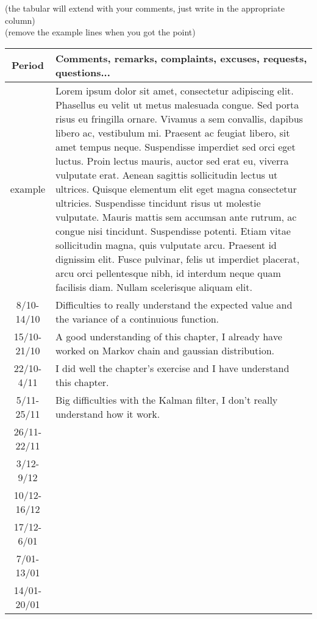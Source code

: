 \documentclass[10pt,a4paper]{article}
\begin{document}
 


\pagestyle{fancy}
 
 
 

(the tabular will extend with your comments, just write in the appropriate column)\\
(remove the example lines when you got the point)\\


\noindent\begin{tabular}{|c|p{}|}
\hline
Period & Comments, remarks, complaints, excuses, requests, questions...\\
\hline
\hline
example & Lorem ipsum dolor sit amet, consectetur adipiscing elit. Phasellus eu velit ut metus malesuada congue. Sed porta risus eu fringilla ornare. Vivamus a sem convallis, dapibus libero ac, vestibulum mi. Praesent ac feugiat libero, sit amet tempus neque. Suspendisse imperdiet sed orci eget luctus. Proin lectus mauris, auctor sed erat eu, viverra vulputate erat. Aenean sagittis sollicitudin lectus ut ultrices. Quisque elementum elit eget magna consectetur ultricies. Suspendisse tincidunt risus ut molestie vulputate. Mauris mattis sem accumsan ante rutrum, ac congue nisi tincidunt. Suspendisse potenti. Etiam vitae sollicitudin magna, quis vulputate arcu. Praesent id dignissim elit. Fusce pulvinar, felis ut imperdiet placerat, arcu orci pellentesque nibh, id interdum neque quam facilisis diam. Nullam scelerisque aliquam elit.\\
\hline
8/10-14/10 &Difficulties to really understand the expected value and the variance of a continuious function.\\ 
\hline
15/10-21/10 &A good understanding of this chapter, I already have worked on Markov chain and gaussian distribution.\\ 
\hline
22/10-4/11 &I did well the chapter's exercise and I have understand this chapter.\\ 
\hline
5/11-25/11 &Big difficulties with the Kalman filter, I don't really understand how it work.\\
\hline
26/11-22/11 &\\
\hline
3/12-9/12 &\\
\hline
10/12-16/12  &\\
\hline
17/12-6/01&\\
\hline
7/01-13/01 &\\
\hline
14/01-20/01 &\\
\hline
\end{tabular}\\
\end{document}
